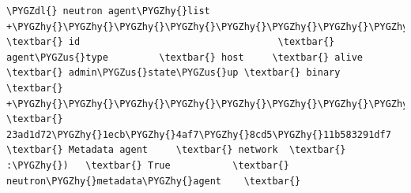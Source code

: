 \documentclass[letterpaper,10pt,english]{sphinxmanual}
\def\PYGZus{\char`\_}
\def\PYGZdl{\char`\$}
\def\PYGZhy{\char`\-}
\begin{document}
\begin{enumerate}
\begin{Verbatim}[commandchars=\\\{\}]
\PYGZdl{} neutron agent\PYGZhy{}list
+\PYGZhy{}\PYGZhy{}\PYGZhy{}\PYGZhy{}\PYGZhy{}\PYGZhy{}\PYGZhy{}\PYGZhy{}\PYGZhy{}\PYGZhy{}\PYGZhy{}\PYGZhy{}\PYGZhy{}\PYGZhy{}\PYGZhy{}\PYGZhy{}\PYGZhy{}\PYGZhy{}\PYGZhy{}\PYGZhy{}\PYGZhy{}\PYGZhy{}\PYGZhy{}\PYGZhy{}\PYGZhy{}\PYGZhy{}\PYGZhy{}\PYGZhy{}\PYGZhy{}\PYGZhy{}\PYGZhy{}\PYGZhy{}\PYGZhy{}\PYGZhy{}\PYGZhy{}\PYGZhy{}\PYGZhy{}\PYGZhy{}+\PYGZhy{}\PYGZhy{}\PYGZhy{}\PYGZhy{}\PYGZhy{}\PYGZhy{}\PYGZhy{}\PYGZhy{}\PYGZhy{}\PYGZhy{}\PYGZhy{}\PYGZhy{}\PYGZhy{}\PYGZhy{}\PYGZhy{}\PYGZhy{}\PYGZhy{}\PYGZhy{}\PYGZhy{}\PYGZhy{}+\PYGZhy{}\PYGZhy{}\PYGZhy{}\PYGZhy{}\PYGZhy{}\PYGZhy{}\PYGZhy{}\PYGZhy{}\PYGZhy{}\PYGZhy{}+\PYGZhy{}\PYGZhy{}\PYGZhy{}\PYGZhy{}\PYGZhy{}\PYGZhy{}\PYGZhy{}+\PYGZhy{}\PYGZhy{}\PYGZhy{}\PYGZhy{}\PYGZhy{}\PYGZhy{}\PYGZhy{}\PYGZhy{}\PYGZhy{}\PYGZhy{}\PYGZhy{}\PYGZhy{}\PYGZhy{}\PYGZhy{}\PYGZhy{}\PYGZhy{}+\PYGZhy{}\PYGZhy{}\PYGZhy{}\PYGZhy{}\PYGZhy{}\PYGZhy{}\PYGZhy{}\PYGZhy{}\PYGZhy{}\PYGZhy{}\PYGZhy{}\PYGZhy{}\PYGZhy{}\PYGZhy{}\PYGZhy{}\PYGZhy{}\PYGZhy{}\PYGZhy{}\PYGZhy{}\PYGZhy{}\PYGZhy{}\PYGZhy{}\PYGZhy{}\PYGZhy{}\PYGZhy{}\PYGZhy{}\PYGZhy{}+
\textbar{} id                                   \textbar{} agent\PYGZus{}type         \textbar{} host     \textbar{} alive \textbar{} admin\PYGZus{}state\PYGZus{}up \textbar{} binary                    \textbar{}
+\PYGZhy{}\PYGZhy{}\PYGZhy{}\PYGZhy{}\PYGZhy{}\PYGZhy{}\PYGZhy{}\PYGZhy{}\PYGZhy{}\PYGZhy{}\PYGZhy{}\PYGZhy{}\PYGZhy{}\PYGZhy{}\PYGZhy{}\PYGZhy{}\PYGZhy{}\PYGZhy{}\PYGZhy{}\PYGZhy{}\PYGZhy{}\PYGZhy{}\PYGZhy{}\PYGZhy{}\PYGZhy{}\PYGZhy{}\PYGZhy{}\PYGZhy{}\PYGZhy{}\PYGZhy{}\PYGZhy{}\PYGZhy{}\PYGZhy{}\PYGZhy{}\PYGZhy{}\PYGZhy{}\PYGZhy{}\PYGZhy{}+\PYGZhy{}\PYGZhy{}\PYGZhy{}\PYGZhy{}\PYGZhy{}\PYGZhy{}\PYGZhy{}\PYGZhy{}\PYGZhy{}\PYGZhy{}\PYGZhy{}\PYGZhy{}\PYGZhy{}\PYGZhy{}\PYGZhy{}\PYGZhy{}\PYGZhy{}\PYGZhy{}\PYGZhy{}\PYGZhy{}+\PYGZhy{}\PYGZhy{}\PYGZhy{}\PYGZhy{}\PYGZhy{}\PYGZhy{}\PYGZhy{}\PYGZhy{}\PYGZhy{}\PYGZhy{}+\PYGZhy{}\PYGZhy{}\PYGZhy{}\PYGZhy{}\PYGZhy{}\PYGZhy{}\PYGZhy{}+\PYGZhy{}\PYGZhy{}\PYGZhy{}\PYGZhy{}\PYGZhy{}\PYGZhy{}\PYGZhy{}\PYGZhy{}\PYGZhy{}\PYGZhy{}\PYGZhy{}\PYGZhy{}\PYGZhy{}\PYGZhy{}\PYGZhy{}\PYGZhy{}+\PYGZhy{}\PYGZhy{}\PYGZhy{}\PYGZhy{}\PYGZhy{}\PYGZhy{}\PYGZhy{}\PYGZhy{}\PYGZhy{}\PYGZhy{}\PYGZhy{}\PYGZhy{}\PYGZhy{}\PYGZhy{}\PYGZhy{}\PYGZhy{}\PYGZhy{}\PYGZhy{}\PYGZhy{}\PYGZhy{}\PYGZhy{}\PYGZhy{}\PYGZhy{}\PYGZhy{}\PYGZhy{}\PYGZhy{}\PYGZhy{}+
\textbar{} 23ad1d72\PYGZhy{}1ecb\PYGZhy{}4af7\PYGZhy{}8cd5\PYGZhy{}11b583291df7 \textbar{} Metadata agent     \textbar{} network  \textbar{} :\PYGZhy{})   \textbar{} True           \textbar{} neutron\PYGZhy{}metadata\PYGZhy{}agent    \textbar{}

\end{Verbatim}
\end{enumerate}
\end{document}
